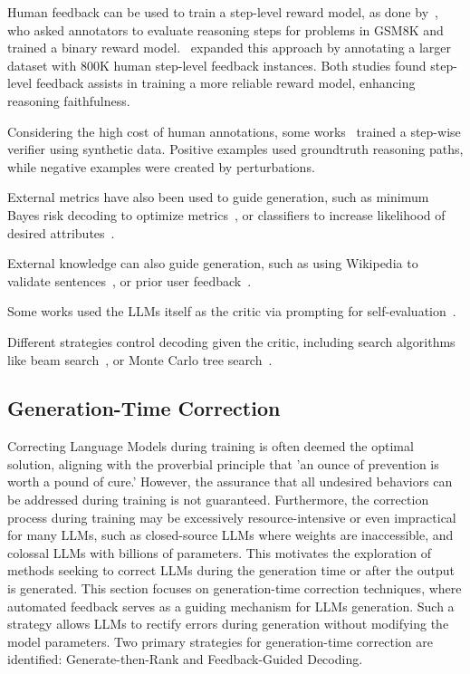 \documentclass[12pt]{extarticle}
\begin{document}
Human feedback can be used to train a step-level reward model, as done by~\cite{uesato2022solving}, who asked annotators to evaluate reasoning steps for problems in GSM8K and trained a binary reward model.~\cite{lightman2023lets} expanded this approach by annotating a larger dataset with 800K human step-level feedback instances. Both studies found step-level feedback assists in training a more reliable reward model, enhancing reasoning faithfulness.

Considering the high cost of human annotations, some works~\cite{yang-etal-2022-generating, tafjord-etal-2022-entailer, li-etal-2023-making, khalifa2023grace} trained a step-wise verifier using synthetic data. Positive examples used groundtruth reasoning paths, while negative examples were created by perturbations.

External metrics have also been used to guide generation, such as minimum Bayes risk decoding to optimize metrics~\cite{freitag-etal-2022-high}, or classifiers to increase likelihood of desired attributes~\cite{dathathri2020plug, yang-klein-2021-fudge, li2022diffusionlm}.

External knowledge can also guide generation, such as using Wikipedia to validate sentences~\cite{varshney2023stitch}, or prior user feedback~\cite{madaan-etal-2022-memory}.

Some works used the LLMs itself as the critic via prompting for self-evaluation~\cite{yao2023tree, xie2023selfevaluation}.

Different strategies control decoding given the critic, including search algorithms like beam search~\cite{khalifa2023grace, xie2023selfevaluation}, or Monte Carlo tree search~\cite{zhu-etal-2023-solving, hao2023reasoning}.

\subsection{Generation-Time Correction}
Correcting Language Models during training is often deemed the optimal solution, aligning with the proverbial principle that 'an ounce of prevention is worth a pound of cure.' However, the assurance that all undesired behaviors can be addressed during training is not guaranteed. Furthermore, the correction process during training may be excessively resource-intensive or even impractical for many LLMs, such as closed-source LLMs where weights are inaccessible, and colossal LLMs with billions of parameters. This motivates the exploration of methods seeking to correct LLMs during the generation time or after the output is generated. This section focuses on generation-time correction techniques, where automated feedback serves as a guiding mechanism for LLMs generation. Such a strategy allows LLMs to rectify errors during generation without modifying the model parameters. Two primary strategies for generation-time correction are identified: Generate-then-Rank and Feedback-Guided Decoding.
\end{document}
